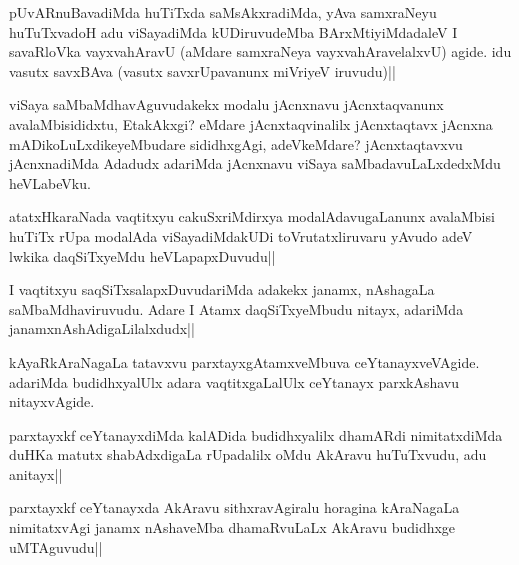
\begin{artha}
pUvARnuBavadiMda huTiTxda saMsAkxradiMda, yAva samxraNeyu huTuTxvadoH adu viSayadiMda kUDiruvudeMba BArxMtiyiMdadaleV I savaRloVka vayxvahAravU (aMdare samxraNeya vayxvahAravelalxvU) agide. idu vasutx savxBAva (vasutx savxrUpavanunx miVriyeV iruvudu)||
\end{artha}


\begin{artha}
viSaya saMbaMdhavAguvudakekx modalu jAcnxnavu jAcnxtaqvanunx avalaMbisididxtu, EtakAkxgi? eMdare jAcnxtaqvinalilx jAcnxtaqtavx jAcnxna mADikoLuLxdikeyeMbudare sididhxgAgi, adeVkeMdare? jAcnxtaqtavxvu jAcnxnadiMda Adadudx adariMda jAcnxnavu viSaya saMbadavuLaLxdedxMdu heVLabeVku.
\end{artha}

\begin{artha}
atatxHkaraNada vaqtitxyu cakuSxriMdirxya modalAdavugaLanunx avalaMbisi huTiTx rUpa modalAda viSayadiMdakUDi toVrutatxliruvaru yAvudo adeV lwkika daqSiTxyeMdu heVLapapxDuvudu||
\end{artha}

\begin{artha}
I vaqtitxyu saqSiTxsalapxDuvudariMda adakekx janamx, nAshagaLa saMbaMdhaviruvudu. Adare I Atamx daqSiTxyeMbudu nitayx, adariMda janamxnAshAdigaLilalxdudx||
\end{artha}

\begin{artha}
kAyaRkAraNagaLa tatavxvu parxtayxgAtamxveMbuva ceYtanayxveVAgide. adariMda budidhxyalUlx adara vaqtitxgaLalUlx ceYtanayx parxkAshavu nitayxvAgide.
\end{artha}

\begin{artha}%
parxtayxkf ceYtanayxdiMda kalADida budidhxyalilx dhamARdi nimitatxdiMda duHKa matutx shabAdxdigaLa rUpadalilx oMdu AkAravu huTuTxvudu, adu anitayx||
\end{artha}

\begin{artha}
parxtayxkf ceYtanayxda AkAravu sithxravAgiralu horagina kAraNagaLa nimitatxvAgi janamx nAshaveMba dhamaRvuLaLx AkAravu budidhxge uMTAguvudu||
\end{artha}

